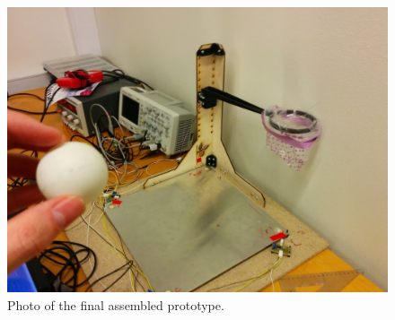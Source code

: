 		\begin{figure}[tb]
			\begin{center}
				\includegraphics[width=.8\textwidth]{figures/photo1}
			\end{center}
			\caption{Photo of the final assembled prototype.}
			\label{fig:photo1}
		\end{figure}
